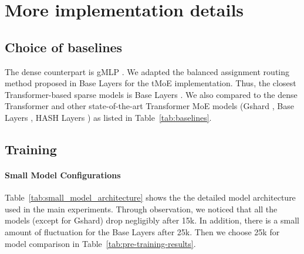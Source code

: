 \documentclass{article}
\begin{document}
\section{More implementation details}
\label{sec:more_experiments}


\subsection{Choice of baselines}
\label{sec:app_baselines}
The dense counterpart is gMLP \citep{gmlp}. We adapted the balanced assignment routing method proposed in Base Layers \citep{baselayer} for the tMoE implementation. Thus, the closest Transformer-based sparse models is Base Layers \citep{baselayer}. We also compared to the dense Transformer \citep{vaswani2017attention} and other state-of-the-art Transformer MoE models (Gshard \citep{gshard}, Base Layers \citep{baselayer}, HASH Layers \citep{hashlayer}) as listed in Table~\ref{tab:baselines}.






\subsection{Training}
\paragraph{Small Model Configurations} Table~\ref{tab:small_model_architecture} shows the the detailed model architecture used in the main experiments. Through observation, we noticed that all the models (except for Gshard) drop negligibly after 15k. In addition, there is a small amount of fluctuation for the Base Layers after 25k. Then we choose 25k for model comparison in Table~\ref{tab:pre-training-results}.
\end{document}
